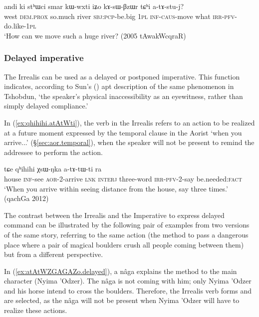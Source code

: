 \begin{exe}
\ex \label{ex:tChi.atAstuj}
\gll andi ki stʰɯci smar kɯ-wxti iʑo kɤ-sɯ-βzɯr tɕʰi a-tɤ-stu-j? \\
west \textsc{dem}.\textsc{prox} so.much river \textsc{sbj}:\textsc{pcp}-be.big \textsc{1pl} \textsc{inf}-\textsc{caus}-move what \textsc{irr}-\textsc{pfv}-do.like-\textsc{1pl} \\
\glt `How can we move such a huge river? (2005 tAwakWcqraR)
\end{exe}

 
\subsubsection{Delayed imperative} \label{sec:irrealis.delayed.imp}
The Irrealis can be used as a delayed or postponed imperative. This function indicates, according to Sun's (\citeyear[809]{jackson07irrealis}) apt description of the same phenomenon in Tshobdun, `the  speaker’s  physical  inaccessibility  as  an  eyewitness,  rather  than  simply  delayed  compliance.'

In (\ref{ex:qhihihi.atAtWti}), the verb in the Irrealis  refers to an action to be realized at a future moment expressed by the temporal clause in the Aorist  `when you arrive...' (§\ref{sec:aor.temporal}), when the speaker will not be present to remind the addressee to perform the action.

\begin{exe}
\ex \label{ex:qhihihi.atAtWti}
 tɕe qʰihihi χsɯ-ŋka a-tɤ-tɯ-ti ra \\
house \textsc{inf}-see \textsc{aor}-2-arrive \textsc{lnk} \textsc{interj} three-word \textsc{irr}-\textsc{pfv}-2-say be.needed:\textsc{fact} \\
\glt `When you arrive within seeing distance from the house, say  three times.' (qachGa 2012) 	
\end{exe}

The contrast between the Irrealis and the Imperative to express delayed command can be illustrated by the following pair of examples from two versions of the same story, referring to the same action (the method to pass a dangerous place where a pair of magical boulders crush all people coming between them) but from a different perspective. 

In (\ref{ex:atAtWZGAGAZo.delayed}), a nâga explains the method to the main character (Nyima 'Odzer). The nâga is not coming with him; only Nyima 'Odzer and his horse intend to cross the boulders. Therefore, the Irrealis verb forms  and  are selected, as the nâga will not be present when Nyima 'Odzer will have to realize these actions. 

